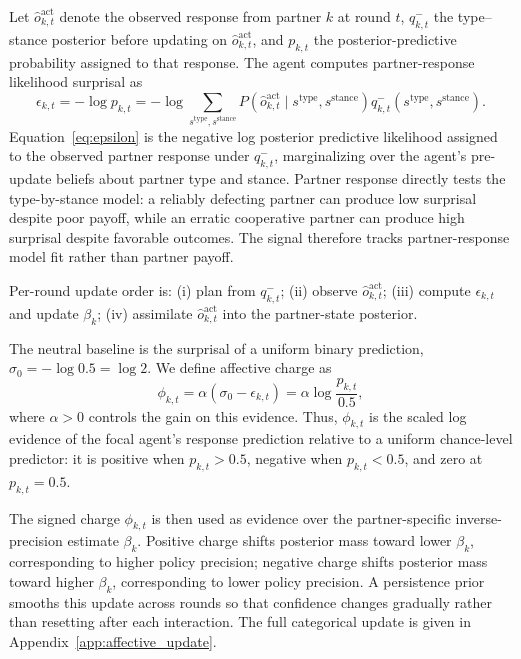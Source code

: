 Let \(\hat{o}_{k,t}^{\text{act}}\) denote the observed response from partner \(k\) at round \(t\), \(q_{k,t}^-\) the type--stance posterior before updating on \(\hat{o}_{k,t}^{\text{act}}\), and \(p_{k,t}\) the posterior-predictive probability assigned to that response. The agent computes partner-response likelihood surprisal as
\begin{equation}
\epsilon_{k,t} = -\log p_{k,t} = -\log \sum_{s^{\text{type}},s^{\text{stance}}}
P\!\left(\hat{o}_{k,t}^{\text{act}} \mid s^{\text{type}},s^{\text{stance}}\right)
q_{k,t}^-(s^{\text{type}},s^{\text{stance}}).
\label{eq:epsilon}
\end{equation}
Equation~\eqref{eq:epsilon} is the negative log posterior predictive likelihood assigned to the observed partner response under \(q_{k,t}^-\), marginalizing over the agent's pre-update beliefs about partner type and stance. Partner response directly tests the type-by-stance model: a reliably defecting partner can produce low surprisal despite poor payoff, while an erratic cooperative partner can produce high surprisal despite favorable outcomes. The signal therefore tracks partner-response model fit rather than partner payoff.

Per-round update order is: (i) plan from \(q_{k,t}^-\); (ii) observe \(\hat{o}_{k,t}^{\text{act}}\); (iii) compute \(\epsilon_{k,t}\) and update \(\beta_k\); (iv) assimilate \(\hat{o}_{k,t}^{\text{act}}\) into the partner-state posterior.

The neutral baseline is the surprisal of a uniform binary prediction, \(\sigma_0=-\log 0.5=\log 2\). We define affective charge as
\begin{equation}
\phi_{k,t}
= \alpha\!\left(\sigma_0 - \epsilon_{k,t}\right)
= \alpha \log\frac{p_{k,t}}{0.5},
\label{eq:charge}
\end{equation}
where \(\alpha>0\) controls the gain on this evidence. Thus, \(\phi_{k,t}\) is the scaled log evidence of the focal agent's response prediction relative to a uniform chance-level predictor: it is positive when \(p_{k,t}>0.5\), negative when \(p_{k,t}<0.5\), and zero at \(p_{k,t}=0.5\).

The signed charge $\phi_{k,t}$ is then used as evidence over the partner-specific inverse-precision estimate $\beta_k$. Positive charge shifts posterior mass toward lower $\beta_k$, corresponding to higher policy precision; negative charge shifts posterior mass toward higher $\beta_k$, corresponding to lower policy precision. A persistence prior smooths this update across rounds so that confidence changes gradually rather than resetting after each interaction. The full categorical update is given in Appendix~\ref{app:affective_update}.

